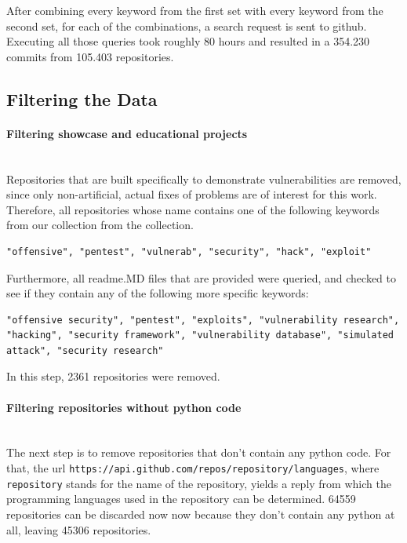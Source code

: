 \documentclass[
	a4paper,
	pagesize,
	pdftex,
	12pt,
	twoside, %
	BCOR=5mm, %
	ngerman,
	fleqn,
	final,
	]{scrartcl}
\begin{document}
After combining every keyword from the first set with every keyword from the second set, for each of the combinations, a search request is sent to github. Executing all those queries took roughly 80 hours and resulted in a 354.230 commits from 105.403 repositories.

 

\subsection{Filtering the Data}

\paragraph{Filtering showcase and educational projects}\mbox{}\\
Repositories that are built specifically to demonstrate vulnerabilities are removed, since only non-artificial, actual fixes of problems are of interest for this work. Therefore, all repositories whose name contains one of the following keywords from our collection from the collection.

\begin{lstlisting}
"offensive", "pentest", "vulnerab", "security", "hack", "exploit"
\end{lstlisting}

Furthermore, all readme.MD files that are provided were queried, and checked to see if they contain any of the following more specific keywords:

\begin{lstlisting}
"offensive security", "pentest", "exploits", "vulnerability research", "hacking", "security framework", "vulnerability database", "simulated attack", "security research"
\end{lstlisting}

In this step, 2361 repositories were removed.

\paragraph{Filtering repositories without python code}\mbox{}\\
The next step is to remove repositories that don't contain any python code. For that, the url \lstinline[columns=fixed]{https://api.github.com/repos/repository/languages}, where \lstinline[columns=fixed]{repository} stands for the name of the repository, yields a reply from which the programming languages used in the repository can be determined. 64559 repositories can be discarded now now because they don't contain any python at all, leaving 45306 repositories.
\end{document}
